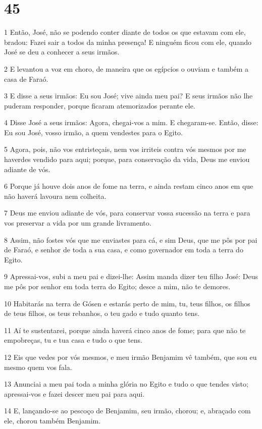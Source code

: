 \chapter{45}

\par 1 Então, José, não se podendo conter diante de todos os que estavam com ele, bradou: Fazei sair a todos da minha presença! E ninguém ficou com ele, quando José se deu a conhecer a seus irmãos.
\par 2 E levantou a voz em choro, de maneira que os egípcios o ouviam e também a casa de Faraó.
\par 3 E disse a seus irmãos: Eu sou José; vive ainda meu pai? E seus irmãos não lhe puderam responder, porque ficaram atemorizados perante ele.
\par 4 Disse José a seus irmãos: Agora, chegai-vos a mim. E chegaram-se. Então, disse: Eu sou José, vosso irmão, a quem vendestes para o Egito.
\par 5 Agora, pois, não vos entristeçais, nem vos irriteis contra vós mesmos por me haverdes vendido para aqui; porque, para conservação da vida, Deus me enviou adiante de vós.
\par 6 Porque já houve dois anos de fome na terra, e ainda restam cinco anos em que não haverá lavoura nem colheita.
\par 7 Deus me enviou adiante de vós, para conservar vossa sucessão na terra e para vos preservar a vida por um grande livramento.
\par 8 Assim, não fostes vós que me enviastes para cá, e sim Deus, que me pôs por pai de Faraó, e senhor de toda a sua casa, e como governador em toda a terra do Egito.
\par 9 Apressai-vos, subi a meu pai e dizei-lhe: Assim manda dizer teu filho José: Deus me pôs por senhor em toda terra do Egito; desce a mim, não te demores.
\par 10 Habitarás na terra de Gósen e estarás perto de mim, tu, teus filhos, os filhos de teus filhos, os teus rebanhos, o teu gado e tudo quanto tens.
\par 11 Aí te sustentarei, porque ainda haverá cinco anos de fome; para que não te empobreças, tu e tua casa e tudo o que tens.
\par 12 Eis que vedes por vós mesmos, e meu irmão Benjamim vê também, que sou eu mesmo quem vos fala.
\par 13 Anunciai a meu pai toda a minha glória no Egito e tudo o que tendes visto; apressai-vos e fazei descer meu pai para aqui.
\par 14 E, lançando-se ao pescoço de Benjamim, seu irmão, chorou; e, abraçado com ele, chorou também Benjamim.
